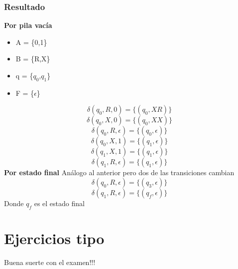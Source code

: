 \documentclass[12pt]{article}
\begin{document}
\subsubsection{Resultado}
\textbf{Por pila vacía}
\begin{itemize}
    \item A = \{0,1\}
    \item B = \{R,X\}
    \item q = \{$q_0$,$q_1$\}
    \item F = \{$\epsilon$\}
\end{itemize}
\[\delta(q_0, R, 0) = \{(q_0, XR)\}\]
\[\delta(q_0, X, 0) = \{(q_0, XX)\}\]
\[\delta(q_0, R, \epsilon) = \{(q_0, \epsilon)\}\]
\[\delta(q_0, X, 1) = \{(q_1, \epsilon)\}\]
\[\delta(q_1, X, 1) = \{(q_1, \epsilon)\}\]
\[\delta(q_1, R, \epsilon) = \{(q_1, \epsilon)\}\]
\newline
\textbf{Por estado final}
Análogo al anterior pero dos de las transiciones cambian
\[\delta(q_0, R, \epsilon) = \{(q_3, \epsilon)\}\]
\[\delta(q_1, R, \epsilon) = \{(q_f, \epsilon)\}\]
Donde $q_f$ es el estado final
\newpage
\section{Ejercicios tipo}
\newpage
Buena suerte con el examen!!!
\end{document}
